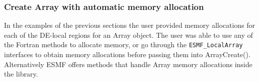  
\setlength{\oldparskip}{\parskip}
\setlength{\parskip}{1.5ex}
\setlength{\oldparindent}{\parindent}
\setlength{\parindent}{0pt}
\setlength{\oldbaselineskip}{\baselineskip}
\setlength{\baselineskip}{11pt}
 
\def\bv{\begin{verbatim}}
\def\ev{\end{verbatim}}
\def\be{\begin{equation}}
\def\ee{\end{equation}}
\def\bea{\begin{eqnarray}}
\def\eea{\end{eqnarray}}
\def\bi{\begin{itemize}}
\def\ei{\end{itemize}}
\def\bn{\begin{enumerate}}
\def\en{\end{enumerate}}
\def\bd{\begin{description}}
\def\ed{\end{description}}
\def\({\left (}
\def\){\right )}
\def\[{\left [}
\def\]{\right ]}
\def\<{\left  \langle}
\def\>{\right \rangle}
\def\cI{{\cal I}}
\def\diag{\mathop{\rm diag}}
\def\tr{\mathop{\rm tr}}


 

   \subsubsection{Create Array with automatic memory allocation}
  
   In the examples of the previous sections the user provided memory allocations
   for each of the DE-local regions for an Array object. The user was able to 
   use any of the Fortran methods to allocate memory, or go through
   the {\tt ESMF\_LocalArray} interfaces to obtain memory allocations before
   passing them into ArrayCreate(). Alternatively ESMF offers methods that 
   handle Array memory allocations inside the library.
   
